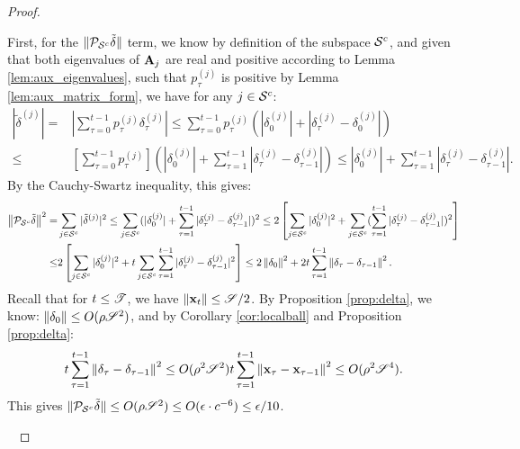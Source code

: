 \begin{proof}
~

First, for the $\|\proj_{\S^c} \tilde{\delta}\|$ term, we know by definition of the subspace $\S^c$, and given that both eigenvalues of $\A_j$ are real and positive according to Lemma \ref{lem:aux_eigenvalues}, such that $p^{(j)}_\tau$ is positive by Lemma \ref{lem:aux_matrix_form}, we have for any $j\in \S^c$:
\begin{align*}
|\tilde{\delta}^{(j)}| = &|\sum_{\tau = 0}^{t-1} p^{(j)}_\tau \delta_\tau^{(j)}|
\le \sum_{\tau = 0}^{t-1} p^{(j)}_\tau (|\delta_0^{(j)}| + |\delta_\tau^{(j)} - \delta_0^{(j)} |)\\
\le &\left[\sum_{\tau = 0}^{t-1} p^{(j)}_\tau \right]\left(|\delta_0^{(j)}| + \sum_{\tau = 1}^{t-1}|\delta_\tau^{(j)} - \delta_{\tau-1}^{(j)} |\right)
\le |\delta_0^{(j)}| + \sum_{\tau = 1}^{t-1}|\delta_\tau^{(j)} - \delta_{\tau-1}^{(j)} |.
\end{align*}
By the Cauchy-Swartz inequality, this gives:
\begin{align*}
\norm{\proj_{\S^c} \tilde{\delta}}^2
=& \sum_{j\in \S^c} |\tilde{\delta}^{(j)}|^2 \le \sum_{j\in \S^c} (|\delta_0^{(j)}| + \sum_{\tau = 1}^{t-1}|\delta_\tau^{(j)} - \delta_{\tau-1}^{(j)} |)^2
\le 2\left[\sum_{j\in \S^c}|\delta_0^{(j)}|^2 + \sum_{j\in \S^c} (\sum_{\tau = 1}^{t-1}|\delta_\tau^{(j)} - \delta_{\tau-1}^{(j)} |)^2\right] \\
\le& 2\left[\sum_{j\in \S^c}|\delta_0^{(j)}|^2 + t\sum_{j\in \S^c} \sum_{\tau = 1}^{t-1}|\delta_\tau^{(j)} - \delta_{\tau-1}^{(j)} |^2 \right] 
\le 2\norm{\delta_0}^2 + 2t\sum_{\tau = 1}^{t-1}\norm{\delta_\tau- \delta_{\tau-1}}^2.
\end{align*}
Recall that for $t \le \utime$, we have $\norm{\x_t} \le \uspace/2$.
By Proposition \ref{prop:delta}, we know:
$\norm{\delta_0} \le O( \rho \uspace^2)$, 
and by Corollary \ref{cor:localball} and Proposition \ref{prop:delta}:
\begin{align*}
t\sum_{\tau = 1}^{t-1}\norm{\delta_\tau- \delta_{\tau-1}}^2
\le O(\rho^2 \uspace^2) t\sum_{\tau = 1}^{t-1}\norm{\x_\tau- \x_{\tau-1}}^2
\le O(\rho^2 \uspace^4).
\end{align*}
This gives $\|\proj_{\S^c} \tilde{\delta}\| \le O( \rho \uspace^2) \le O(\epsilon \cdot c^{-6}) \le \epsilon/10$.

~


\end{proof}
